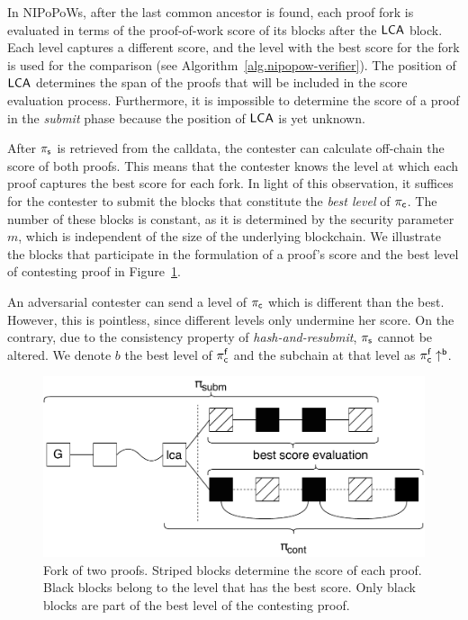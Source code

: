 In NIPoPoWs, after the last common ancestor is found, each proof fork
is evaluated in terms of the proof-of-work score of its blocks after the $\mathsf{LCA}$
block. Each level captures a different
score, and the level with the best score for the fork is used for the comparison
(see Algorithm~\ref{alg.nipopow-verifier}).
The position of $\mathsf{LCA}$ determines the span of the proofs that
will be included in the score evaluation process. Furthermore, it is impossible
to determine the score of a proof in the \emph{submit} phase because the position
of $\mathsf{LCA}$ is yet unknown.

After $\mathsf{\pi_{s}}$ is retrieved from the calldata, the contester can calculate off-chain
the score of both proofs. This means that the contester knows the level at which each
proof captures the best score for each fork. In light of this
observation, it suffices for the contester to submit the blocks that constitute the \emph{best level}
of $\mathsf{\pi_{c}}$. The number of these blocks is constant, as it is determined by the
security parameter $m$, which is independent of the size of the underlying
blockchain. We illustrate the blocks that participate in the formulation of a
proof's score and the best level of contesting proof in
Figure~\ref{fig:score-at-levels}.

An adversarial contester can send a level of $\mathsf{\pi_{c}}$ which is
different than the best. However, this is pointless, since
different levels only undermine her score. On the contrary, due to
the consistency property of \emph{hash-and-resubmit}, $\mathsf{\pi_{s}}$ cannot be altered.
We denote $b$ the best level of $\mathsf{\pi_{c}^{f}}$ and the subchain at that level as $\mathsf{\pi_{c}^f\uparrow^{b}}$.

\begin{figure}[!h]
\vspace*{-5mm}
    \begin{center}
        \includegraphics[width=0.8\columnwidth]{figures/blocks-of-best-level.pdf}
    \end{center}
    \caption{Fork of two proofs. Striped blocks determine the
    score of each proof. Black blocks belong to the level that
    has the best score. Only black blocks are part of the best level of the
    contesting proof.}
    \label{fig:score-at-levels}
\vspace*{-3mm}
\end{figure}


